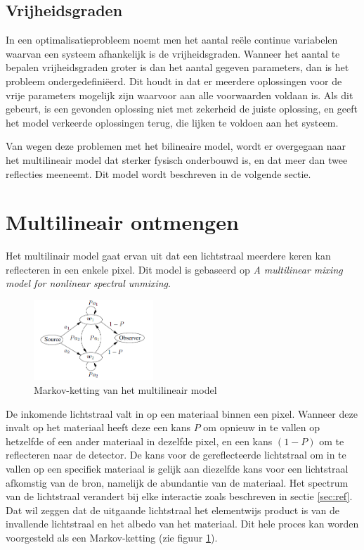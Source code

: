 \documentclass[12pt]{report}
\begin{document}
\subsection{Vrijheidsgraden} \label{sec:vrij}

In een optimalisatieprobleem noemt men het aantal re\"ele continue variabelen waarvan een systeem afhankelijk is de vrijheidsgraden. Wanneer het aantal te bepalen vrijheidsgraden groter is dan het aantal gegeven parameters, dan is het probleem ondergedefini\"eerd. Dit houdt in dat er meerdere  oplossingen voor de vrije parameters mogelijk zijn waarvoor aan alle voorwaarden voldaan is. Als dit gebeurt, is een gevonden oplossing niet met zekerheid de juiste oplossing, en geeft het model verkeerde oplossingen terug, die lijken te voldoen aan het systeem.

Van wegen deze problemen met het bilineaire model, wordt er overgegaan naar het multilineair model dat sterker fysisch onderbouwd is, en dat meer dan twee reflecties meeneemt. Dit model wordt beschreven in de volgende sectie.

\section{Multilineair ontmengen} \label{sec:multi}

Het multilinair model gaat ervan uit dat een lichtstraal meerdere keren kan reflecteren in een enkele pixel. Dit model is gebaseerd op \textit{A multilinear mixing model for nonlinear spectral unmixing}\cite{mlinmix}. 

\begin{figure}
\includegraphics[width=0.4\textwidth]{multi.PNG}
\caption{Markov-ketting van het multilineair model \label{fig:multi}}
\end{figure}

De inkomende lichtstraal valt in op een materiaal binnen een pixel. Wanneer deze invalt op het materiaal heeft deze een kans $P$ om opnieuw in te vallen op hetzelfde of een ander materiaal in dezelfde pixel, en een kans $(1 - P)$ om te reflecteren naar de detector. De kans voor de gereflecteerde lichtstraal om in te vallen op een specifiek materiaal is gelijk aan diezelfde kans voor een lichtstraal afkomstig van de bron, namelijk de abundantie van de materiaal. Het spectrum van de lichtstraal verandert bij elke interactie zoals beschreven in sectie \ref{sec:ref}. Dat wil zeggen dat de uitgaande lichtstraal het elementwijs product is van de invallende lichtstraal en het albedo van het materiaal.
Dit hele proces kan worden voorgesteld als een Markov-ketting (zie figuur \ref{fig:multi}).
\end{document}
